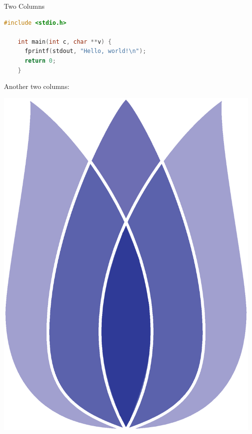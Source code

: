 \documentclass[
 size=12pt,
 paper=smartboard, %
 mode=present, %
 display=slides, %
style=tulip,
pauseslide,
fleqn,leqno,clock]{powerdot}
\begin{document}
\begin{slide}[method=direct]{Two Columns}
  \begin{lstlisting}[language=c,gobble=4]
    #include <stdio.h>

    int main(int c, char **v) {
      fprintf(stdout, "Hello, world!\n");
      return 0;
    }
  \end{lstlisting}
Another two columns:

{
     \centerline{\includegraphics[scale=.3]{logos/tulip-logo.eps}}
}

\end{slide}
\end{document}
